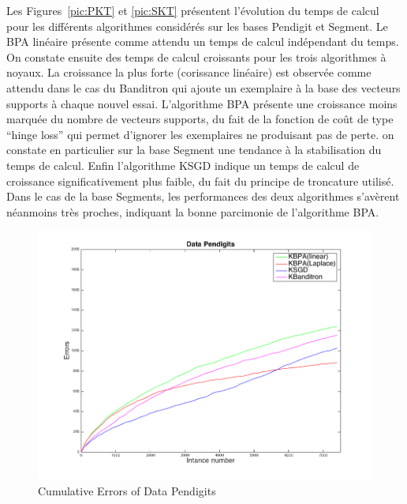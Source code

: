 \documentclass[preprint,12pt,authoryear]{elsarticle}
\begin{document}
Les Figures~\ref{pic:PKT} et \ref{pic:SKT} présentent l'évolution du temps de calcul pour les différents algorithmes considérés sur les bases Pendigit  et Segment.  Le BPA linéaire présente comme attendu un temps de calcul indépendant du temps. On constate ensuite des temps de calcul croissants pour les trois algorithmes à noyaux. La croissance la plus forte (corissance linéaire) est observée comme attendu dans le cas du Banditron qui ajoute un exemplaire à la base des vecteurs supports à chaque nouvel essai. L'algorithme BPA présente une croissance moins marquée du nombre de vecteurs supports, du fait de la fonction de coût de type ``hinge loss'' qui permet d'ignorer les exemplaires ne produisant pas de perte.  on constate en particulier sur la base Segment une tendance à la stabilisation du temps de calcul. Enfin l'algorithme KSGD indique un temps de calcul de croissance significativement plus faible, du fait du principe de troncature utilisé. Dans le cas de la base Segments, les performances des deux algorithmes s'avèrent néanmoins très proches, indiquant la bonne parcimonie de l'algorithme BPA.

\begin{figure}[t!]
	\centerline{
		\includegraphics[width=\linewidth]{figs/Pendigits_kernel_CM.png}}
	\caption{Cumulative Errors of Data Pendigits}
	\label{pic:PKCM}
\end{figure}

\end{document}
